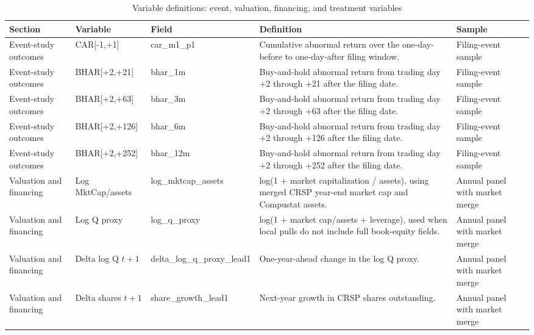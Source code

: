 \begin{table}[p]
\centering
\scriptsize
\setlength{\tabcolsep}{2pt}
\renewcommand{\arraystretch}{1.08}
\caption{Variable definitions: event, valuation, financing, and treatment variables}
\label{tab:appendix_var_defs_market}
\begin{tabularx}{\textwidth}{>{\raggedright\arraybackslash}p{}>{\raggedright\arraybackslash}p{}>{\raggedright\arraybackslash}p{}>{\raggedright\arraybackslash}X>{\raggedright\arraybackslash}p{}}
\hline
Section & Variable & Field & Definition & Sample \\
\hline
Event-study outcomes & CAR[-1,+1] & car\_\allowbreak{}m1\_\allowbreak{}p1 & Cumulative abnormal return over the one-day-before to one-day-after filing window. & Filing-event sample \\
Event-study outcomes & BHAR[+2,+21] & bhar\_\allowbreak{}1m & Buy-and-hold abnormal return from trading day +2 through +21 after the filing date. & Filing-event sample \\
Event-study outcomes & BHAR[+2,+63] & bhar\_\allowbreak{}3m & Buy-and-hold abnormal return from trading day +2 through +63 after the filing date. & Filing-event sample \\
Event-study outcomes & BHAR[+2,+126] & bhar\_\allowbreak{}6m & Buy-and-hold abnormal return from trading day +2 through +126 after the filing date. & Filing-event sample \\
Event-study outcomes & BHAR[+2,+252] & bhar\_\allowbreak{}12m & Buy-and-hold abnormal return from trading day +2 through +252 after the filing date. & Filing-event sample \\
Valuation and financing & Log MktCap/assets & log\_\allowbreak{}mktcap\_\allowbreak{}assets & log(1 + market capitalization / assets), using merged CRSP year-end market cap and Compustat assets. & Annual panel with market merge \\
Valuation and financing & Log Q proxy & log\_\allowbreak{}q\_\allowbreak{}proxy & log(1 + market cap/assets + leverage), used when local pulls do not include full book-equity fields. & Annual panel with market merge \\
Valuation and financing & Delta log Q $t{+}1$ & delta\_\allowbreak{}log\_\allowbreak{}q\_\allowbreak{}proxy\_\allowbreak{}lead1 & One-year-ahead change in the log Q proxy. & Annual panel with market merge \\
Valuation and financing & Delta shares $t{+}1$ & share\_\allowbreak{}growth\_\allowbreak{}lead1 & Next-year growth in CRSP shares outstanding. & Annual panel with market merge \\

\end{tabularx}
\end{table}
